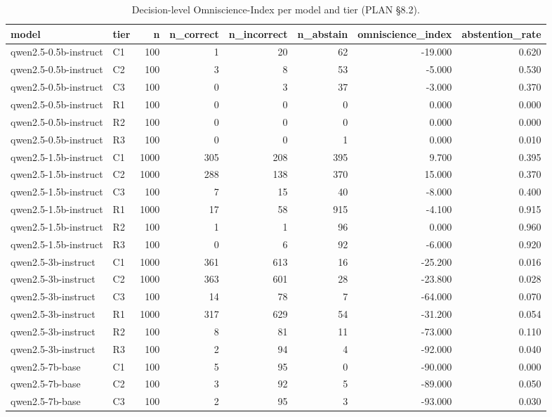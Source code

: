 \begin{table}
\caption{Decision-level Omniscience-Index per model and tier (PLAN §8.2).}
\label{tab:t10_omniscience_index}
\begin{tabular}{llrrrrrr}
\toprule
model & tier & n & n\_correct & n\_incorrect & n\_abstain & omniscience\_index & abstention\_rate \\
\midrule
qwen2.5-0.5b-instruct & C1 & 100 & 1 & 20 & 62 & -19.000 & 0.620 \\
qwen2.5-0.5b-instruct & C2 & 100 & 3 & 8 & 53 & -5.000 & 0.530 \\
qwen2.5-0.5b-instruct & C3 & 100 & 0 & 3 & 37 & -3.000 & 0.370 \\
qwen2.5-0.5b-instruct & R1 & 100 & 0 & 0 & 0 & 0.000 & 0.000 \\
qwen2.5-0.5b-instruct & R2 & 100 & 0 & 0 & 0 & 0.000 & 0.000 \\
qwen2.5-0.5b-instruct & R3 & 100 & 0 & 0 & 1 & 0.000 & 0.010 \\
qwen2.5-1.5b-instruct & C1 & 1000 & 305 & 208 & 395 & 9.700 & 0.395 \\
qwen2.5-1.5b-instruct & C2 & 1000 & 288 & 138 & 370 & 15.000 & 0.370 \\
qwen2.5-1.5b-instruct & C3 & 100 & 7 & 15 & 40 & -8.000 & 0.400 \\
qwen2.5-1.5b-instruct & R1 & 1000 & 17 & 58 & 915 & -4.100 & 0.915 \\
qwen2.5-1.5b-instruct & R2 & 100 & 1 & 1 & 96 & 0.000 & 0.960 \\
qwen2.5-1.5b-instruct & R3 & 100 & 0 & 6 & 92 & -6.000 & 0.920 \\
qwen2.5-3b-instruct & C1 & 1000 & 361 & 613 & 16 & -25.200 & 0.016 \\
qwen2.5-3b-instruct & C2 & 1000 & 363 & 601 & 28 & -23.800 & 0.028 \\
qwen2.5-3b-instruct & C3 & 100 & 14 & 78 & 7 & -64.000 & 0.070 \\
qwen2.5-3b-instruct & R1 & 1000 & 317 & 629 & 54 & -31.200 & 0.054 \\
qwen2.5-3b-instruct & R2 & 100 & 8 & 81 & 11 & -73.000 & 0.110 \\
qwen2.5-3b-instruct & R3 & 100 & 2 & 94 & 4 & -92.000 & 0.040 \\
qwen2.5-7b-base & C1 & 100 & 5 & 95 & 0 & -90.000 & 0.000 \\
qwen2.5-7b-base & C2 & 100 & 3 & 92 & 5 & -89.000 & 0.050 \\
qwen2.5-7b-base & C3 & 100 & 2 & 95 & 3 & -93.000 & 0.030 \\

\end{tabular}
\end{table}
